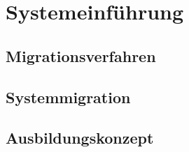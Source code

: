 \chapter{Systemeinführung}
\section{Migrationsverfahren}
\section{Systemmigration}
\section{Ausbildungskonzept}